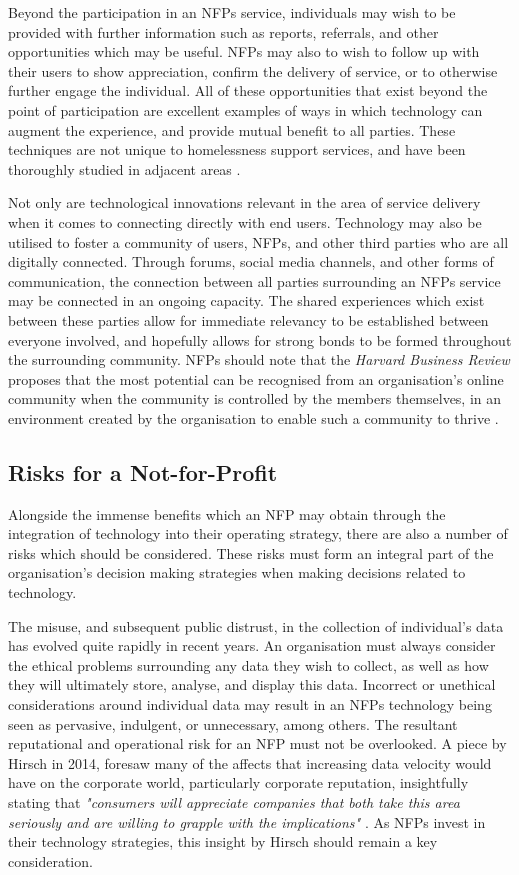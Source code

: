 Beyond the participation in an NFPs service, individuals may wish to be provided with further information such as reports, referrals, and other opportunities which may be useful. NFPs may also to wish to follow up with their users to show appreciation, confirm the delivery of service, or to otherwise further engage the individual. All of these opportunities that exist beyond the point of participation are excellent examples of ways in which technology can augment the experience, and provide mutual benefit to all parties. These techniques are not unique to homelessness support services, and have been thoroughly studied in adjacent areas \cite{bovaird2007beyond}.

Not only are technological innovations relevant in the area of service delivery when it comes to connecting directly with end users. Technology may also be utilised to foster a community of users, NFPs, and other third parties who are all digitally connected. Through forums, social media channels, and other forms of communication, the connection between all parties surrounding an NFPs service may be connected in an ongoing capacity. The shared experiences which exist between these parties allow for immediate relevancy to be established between everyone involved, and hopefully allows for strong bonds to be formed throughout the surrounding community. NFPs should note that the \emph{Harvard Business Review} proposes that the most potential can be recognised from an organisation's online community when the community is controlled by the members themselves, in an environment created by the organisation to enable such a community to thrive \cite{fournier2009getting}.

\subsection{Risks for a Not-for-Profit}

Alongside the immense benefits which an NFP may obtain through the integration of technology into their operating strategy, there are also a number of risks which should be considered. These risks must form an integral part of the organisation's decision making strategies when making decisions related to technology.

The misuse, and subsequent public distrust, in the collection of individual's data has evolved quite rapidly in recent years. An organisation must always consider the ethical problems surrounding any data they wish to collect, as well as how they will ultimately store, analyse, and display this data. Incorrect or unethical considerations around individual data may result in an NFPs technology being seen as pervasive, indulgent, or unnecessary, among others. The resultant reputational and operational risk for an NFP must not be overlooked. A piece by Hirsch in 2014, foresaw many of the affects that increasing data velocity would have on the corporate world, particularly corporate reputation, insightfully stating that \emph{"consumers will appreciate companies that both take this area seriously and are willing to grapple with the implications"} \cite{hirsch2013corporate}. As NFPs invest in their technology strategies, this insight by Hirsch should remain a key consideration.

